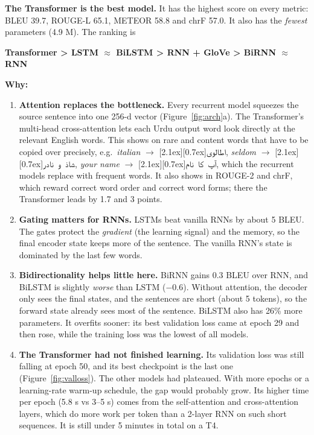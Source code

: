 \documentclass[11pt,a4paper]{article}
\newcommand{\best}[1]{\textbf{\textcolor{cKey}{#1}}}
\newcommand{\ur}[1]{\mbox{\raisebox{0pt}[2.1ex][0.7ex]{\texturdu{#1}}}}
\begin{document}
\begin{keybox}[Answer]
\textbf{The \best{Transformer} is the best model.} It has the highest score on every metric:
BLEU 39.7, ROUGE-L 65.1, METEOR 58.8 and chrF 57.0. It also has the \emph{fewest} parameters (4.9 M). The ranking is

\smallskip
\centering\sffamily\bfseries
\textcolor{cKey}{Transformer} \;>\; \textcolor{cModel}{LSTM $\approx$ BiLSTM} \;>\; \textcolor{cData}{RNN + GloVe} \;>\; \textcolor{cBase}{BiRNN $\approx$ RNN}
\end{keybox}

\textbf{Why:}
\begin{enumerate}[label=\textbf{\arabic*.}]
\item \textbf{Attention replaces the bottleneck.} Every recurrent model squeezes the source sentence into one 256-d vector (Figure~\ref{fig:arch}a).
  The Transformer's multi-head cross-attention lets each Urdu output word look directly at the relevant English words.
  This shows on rare and content words that have to be copied over precisely, e.g.\
  \emph{italian} $\rightarrow$ \ur{اطالوی}, \emph{seldom} $\rightarrow$ \ur{شاذ و نادر}, \emph{your name} $\rightarrow$ \ur{آپ کا نام},
  which the recurrent models replace with frequent words.
  It also shows in ROUGE-2 and chrF, which reward correct word order and correct word forms; there the Transformer leads by 1.7 and 3 points.
\item \textbf{Gating matters for RNNs.} LSTMs beat vanilla RNNs by about 5 BLEU.
  The gates protect the \emph{gradient} (the learning signal) and the memory, so the final encoder state keeps more of the sentence.
  The vanilla RNN's state is dominated by the last few words.
\item \textbf{Bidirectionality helps little here.} BiRNN gains 0.3 BLEU over RNN, and BiLSTM is slightly \emph{worse} than LSTM ($-0.6$).
  Without attention, the decoder only sees the final states, and the sentences are short (about 5 tokens), so the forward state already sees most of the sentence.
  BiLSTM also has 26\% more parameters. It overfits sooner: its best validation loss came at epoch 29 and then rose, while the training loss was the lowest of all models.
\item \textbf{The Transformer had not finished learning.} Its validation loss was still falling at epoch 50, and its best checkpoint is the last one (Figure~\ref{fig:valloss}).
  The other models had plateaued. With more epochs or a learning-rate warm-up schedule, the gap would probably grow.
  Its higher time per epoch (5.8 s vs 3--5 s) comes from the self-attention and cross-attention layers, which do more work per token than a 2-layer RNN on such short sequences.
  It is still under 5 minutes in total on a T4.
\end{enumerate}
\end{document}

